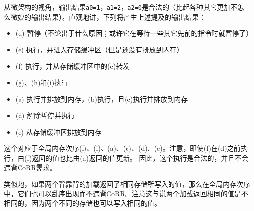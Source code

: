 从微架构的视角，输出结果{\tt a0=1}，{\tt a1=2}，{\tt a2=0}是合法的（比起各种其它更加不怎么微妙的输出结果）。直观地讲，下列将产生上述提及的输出结果：
\begin{itemize}
  \item (d) 暂停（不论出于什么原因；或许它在等待一些其它先前的指令时就暂停了）
  \item (e) 执行，并进入存储缓冲区（但是还没有排放到内存）
  \item (f) 执行，并从存储缓冲区中的(e)转发
  \item (g)、(h)和(i)执行
  \item (a) 执行并排放到内存，(b)执行，且(c)执行并排放到内存
  \item (d) 解除暂停并执行
  \item (e) 从存储缓冲区排放到内存
\end{itemize}
这个对应于全局内存次序(f)、(i)、(a)、(c)、(d)、(e)。注意，即使(f)在(d)之前执行，由(f)返回的值也比由(d)返回的值更新。
因此，这个执行是合法的，并且不会违背CoRR需求。

类似地，如果两个背靠背的加载返回了相同存储所写入的值，那么在全局内存次序中，它们也可以乱序出现而不违背CoRR。注意这与说两个加载返回相同的值是不相同的，因为两个不同的存储也可以写入相同的值。

